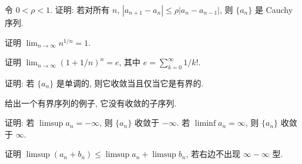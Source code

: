 \documentclass[../../main.tex]{subfiles}
\begin{document}
\begin{exercise}\label{exercise:ch01-40}
令 $0<\rho<1$. 证明: 若对所有 $n$, $|a_{n+1}-a_{n}|\leqslant\rho|a_{n}-a_{n-1}|$, 则 $\{a_{n}\}$ 是 Cauchy 序列.
\end{exercise}

\begin{exercise}\label{exercise:ch01-41}
证明 $\lim_{n\to\infty}n^{1/n}=1$.
\end{exercise}

\begin{exercise}\label{exercise:ch01-42}
证明 $\lim_{n\to\infty}(1+1/n)^{n}=e$, 其中 $e=\sum_{k=0}^{\infty}1/k!$.
\end{exercise}

\begin{exercise}\label{exercise:ch01-43}
证明: 若 $\{a_{n}\}$ 是单调的, 则它收敛当且仅当它是有界的.
\end{exercise}

\begin{exercise}\label{exercise:ch01-44}
给出一个有界序列的例子, 它没有收敛的子序列.
\end{exercise}

\begin{exercise}\label{exercise:ch01-45}
证明: 若 $\limsup a_{n}=-\infty$, 则 $\{a_{n}\}$ 收敛于 $-\infty$. 若 $\liminf a_{n}=\infty$, 则 $\{a_{n}\}$ 收敛于 $\infty$.
\end{exercise}

\begin{exercise}\label{exercise:ch01-46}
证明 $\limsup(a_{n}+b_{n})\leqslant\limsup a_{n}+\limsup b_{n}$, 若右边不出现 $\infty-\infty$ 型.
\end{exercise}
\end{document}
